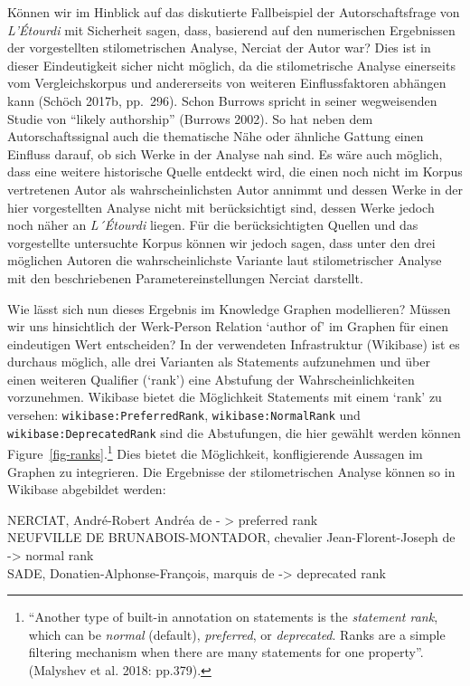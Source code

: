 \documentclass[
  12pt,
  letterpaper,
  DIV=11,
  numbers=noendperiod]{scrreprt}
\begin{document}
Können wir im Hinblick auf das diskutierte Fallbeispiel der
Autorschaftsfrage von \emph{L'Étourdi} mit Sicherheit sagen, dass,
basierend auf den numerischen Ergebnissen der vorgestellten
stilometrischen Analyse, Nerciat der Autor war? Dies ist in dieser
Eindeutigkeit sicher nicht möglich, da die stilometrische Analyse
einerseits vom Vergleichskorpus und andererseits von weiteren
Einflussfaktoren abhängen kann (Schöch 2017b, pp.~296). Schon Burrows
spricht in seiner wegweisenden Studie von ``likely authorship'' (Burrows
2002). So hat neben dem Autorschaftssignal auch die thematische Nähe
oder ähnliche Gattung einen Einfluss darauf, ob sich Werke in der
Analyse nah sind. Es wäre auch möglich, dass eine weitere historische
Quelle entdeckt wird, die einen noch nicht im Korpus vertretenen Autor
als wahrscheinlichsten Autor annimmt und dessen Werke in der hier
vorgestellten Analyse nicht mit berücksichtigt sind, dessen Werke jedoch
noch näher an \emph{L´Étourdi} liegen. Für die berücksichtigten Quellen
und das vorgestellte untersuchte Korpus können wir jedoch sagen, dass
unter den drei möglichen Autoren die wahrscheinlichste Variante laut
stilometrischer Analyse mit den beschriebenen Parametereinstellungen
Nerciat darstellt.

Wie lässt sich nun dieses Ergebnis im Knowledge Graphen modellieren?
Müssen wir uns hinsichtlich der Werk-Person Relation `author of' im
Graphen für einen eindeutigen Wert entscheiden? In der verwendeten
Infrastruktur (Wikibase) ist es durchaus möglich, alle drei Varianten
als Statements aufzunehmen und über einen weiteren Qualifier (`rank')
eine Abstufung der Wahrscheinlichkeiten vorzunehmen. Wikibase bietet die
Möglichkeit Statements mit einem `rank' zu versehen:
\texttt{wikibase:PreferredRank}, \texttt{wikibase:NormalRank} und
\texttt{wikibase:DeprecatedRank} sind die Abstufungen, die hier gewählt
werden können Figure~\ref{fig-ranks}.\footnote{``Another type of
  built-in annotation on statements is the \emph{statement rank}, which
  can be \emph{normal} (default), \emph{preferred}, or
  \emph{deprecated}. Ranks are a simple filtering mechanism when there
  are many statements for one property''. (Malyshev et al. 2018:
  pp.379).} Dies bietet die Möglichkeit, konfligierende Aussagen im
Graphen zu integrieren. Die Ergebnisse der stilometrischen Analyse
können so in Wikibase abgebildet werden:

NERCIAT, André-Robert Andréa de - \textgreater{} preferred rank\\
NEUFVILLE DE BRUNABOIS-MONTADOR, chevalier Jean-Florent-Joseph de
-\textgreater{} normal rank\\
SADE, Donatien-Alphonse-François, marquis de -\textgreater{} deprecated
rank
\end{document}
